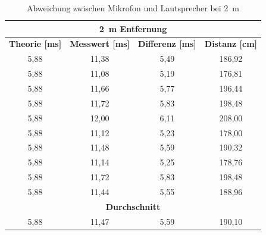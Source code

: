 \begin{table}[H]
\centering
\caption{Abweichung zwischen Mikrofon und Lautsprecher bei \SI{2}{m}}
\label{tab:modul_D_2}
\begin{tabular}{|c|c|c|c|}
\hline
\multicolumn{4}{|c|}{\textbf{\SI{2}{\m} Entfernung}}                                                                                                              \\ \hline
\textbf{Theorie [\si{ms}]} & \textbf{Messwert [\si{ms}]} & \multicolumn{1}{l|}{\textbf{Differenz [\si{ms}]}} & \multicolumn{1}{l|}{\textbf{Distanz [\si{cm}]}} \\ \hline
5,88                      & 11,38                      & 5,49                                             & 186,92                                         \\ \hline
5,88                      & 11,08                      & 5,19                                             & 176,81                                         \\ \hline
5,88                      & 11,66                      & 5,77                                             & 196,44                                         \\ \hline
5,88                      & 11,72                      & 5,83                                             & 198,48                                         \\ \hline
5,88                      & 12,00                      & 6,11                                             & 208,00                                         \\ \hline
5,88                      & 11,12                      & 5,23                                             & 178,00                                         \\ \hline
5,88                      & 11,48                      & 5,59                                             & 190,32                                         \\ \hline
5,88                      & 11,14                      & 5,25                                             & 178,76                                         \\ \hline
5,88                      & 11,72                      & 5,83                                             & 198,48                                         \\ \hline
5,88                      & 11,44                      & 5,55                                             & 188,96                                         \\ \hline
\multicolumn{4}{|c|}{\textbf{Durchschnitt}}                                                                                                                \\ \hline
5,88                      & 11,47                      & 5,59                                             & 190,10                                         \\ \hline
\end{tabular}
\end{table}




